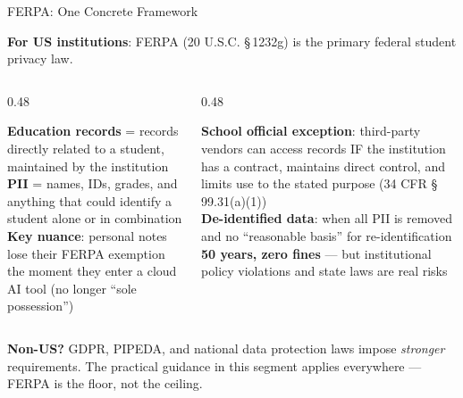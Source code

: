 \documentclass[aspectratio=169, 10pt]{beamer}
\begin{document}
\begin{frame}{FERPA: One Concrete Framework}

\footnotesize

\textbf{For US institutions}: FERPA (20 U.S.C. \S\,1232g) is the primary federal student privacy law.

\vspace{0.15cm}

\begin{columns}[T]
\begin{column}{0.48\textwidth}
\begin{tcolorbox}[keybox, title={\faLock\quad Core Protections}]
\footnotesize
\textbf{Education records} = records directly related to a student, maintained by the institution\\[4pt]
\textbf{PII} = names, IDs, grades, and anything that could identify a student alone or in combination\\[4pt]
\textbf{Key nuance}: personal notes lose their FERPA exemption the moment they enter a cloud AI tool (no longer ``sole possession'')
\end{tcolorbox}
\end{column}

\begin{column}{0.48\textwidth}
\begin{tcolorbox}[keybox, title={\faCheckCircle\quad When Sharing Is Allowed}]
\footnotesize
\textbf{School official exception}: third-party vendors can access records IF the institution has a contract, maintains direct control, and limits use to the stated purpose (34 CFR \S\,99.31(a)(1))\\[4pt]
\textbf{De-identified data}: when all PII is removed and no ``reasonable basis'' for re-identification\\[4pt]
\textbf{50 years, zero fines} --- but institutional policy violations and state laws are real risks
\end{tcolorbox}
\end{column}
\end{columns}

\vspace{0.15cm}

\begin{tcolorbox}[accentbox]
\centering
\footnotesize\textbf{Non-US?} GDPR, PIPEDA, and national data protection laws impose \textit{stronger} requirements. The practical guidance in this segment applies everywhere --- FERPA is the floor, not the ceiling.
\end{tcolorbox}

\end{frame}
\end{document}
